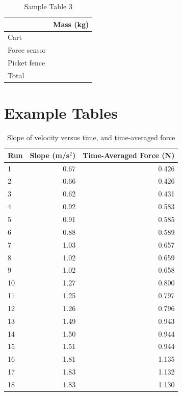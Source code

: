 %
\newpage
\begin{table}[ht!]
    \begin{center}
        \begin{tabular}{l | l}
            & Mass (kg) \\
            \hline
            Cart & \\
            Force sensor & \\
            Picket fence & \\
            \hline
            Total & \\
            \hline
        \end{tabular}
    \end{center}
    \caption{Sample Table 3}
\end{table}
%
\newpage
\section{Example Tables}
%
\begin{table}[ht]
    \centering
    \begin{tabular}{l|r|r}
        \textbf{Run} & \textbf{Slope} (m/s$^{2}$) & \textbf{Time-Averaged Force} (N) \\
        \hline
        1 & 0.67 & 0.426 \\
        2 & 0.66 & 0.426 \\
        3 & 0.62 & 0.431 \\
        \hline
        4 & 0.92 & 0.583 \\
        5 & 0.91 & 0.585 \\
        6 & 0.88 & 0.589 \\
        \hline
        7 & 1.03 & 0.657 \\
        8 & 1.02 & 0.659 \\
        9 & 1.02 & 0.658 \\
        \hline
        10 & 1.27 & 0.800 \\
        11 & 1.25 & 0.797 \\
        12 & 1.26 & 0.796 \\
        \hline
        13 & 1.49 & 0.943 \\
        14 & 1.50 & 0.944 \\
        15 & 1.51 & 0.944 \\
        \hline
        16 & 1.81 & 1.135 \\
        17 & 1.83 & 1.132 \\
        18 & 1.83 & 1.130 \\
        \hline
    \end{tabular}
    \caption{Slope of velocity versus time, and time-averaged force}
    \label{table:04.results}
\end{table}
